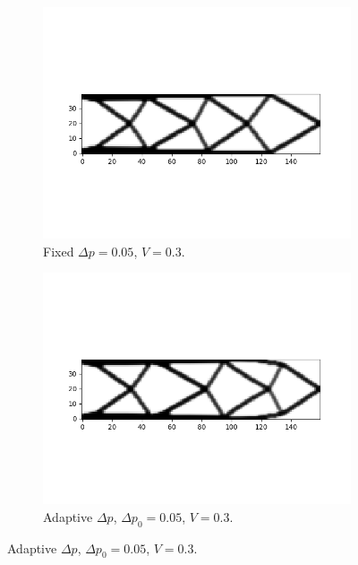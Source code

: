   \begin{figure}
    \begin{subfigure}{0.45\textwidth}
      \centering
      \includegraphics[width=1\textwidth]{images/adaptive_csimp/cantilever_dec_tol_csimp_03_0001_80_false_001_ip.png}
      \caption{Fixed $\Delta p = 0.05$, $V = 0.3$.}
    \end{subfigure} \hfill
    \begin{subfigure}{0.45\textwidth}
      \centering
      \includegraphics[width=1\textwidth]{images/adaptive_csimp/cantilever_dec_tol_csimp_03_0001_80_true_001_ip.png}
      \caption{Adaptive $\Delta p$, $\Delta p_0 = 0.05$, $V = 0.3$.}
    \end{subfigure}


\end{figure}
